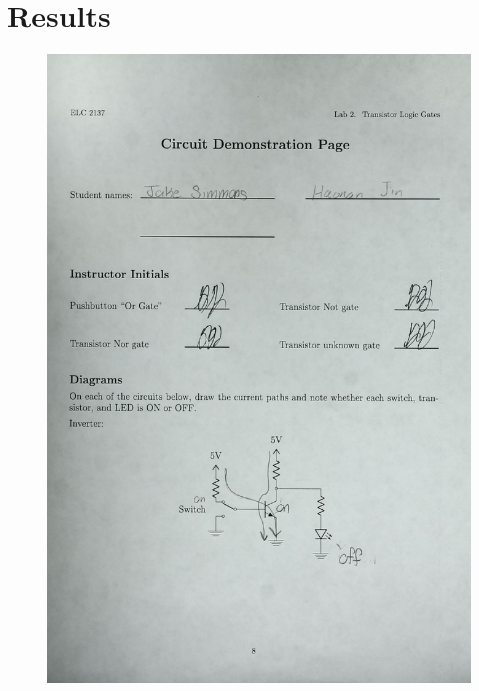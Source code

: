 \documentclass[11pt]{article}
\begin{document}
\section*{Results}
\begin{center}
\begin{figure}
		\includegraphics[width=1\textwidth,page=1]{Lab_2_Scan.pdf}
\end{figure}


\end{center}
\end{document}
